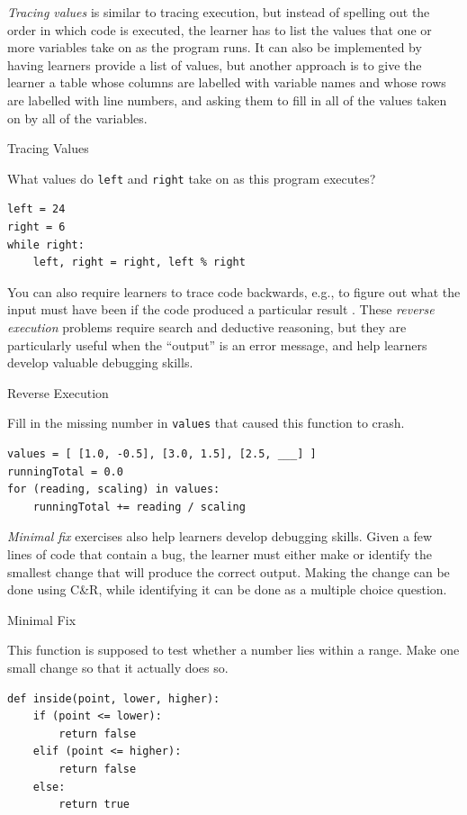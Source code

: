 \emph{Tracing values} is similar to tracing execution, but instead of
spelling out the order in which code is executed, the learner has to
list the values that one or more variables take on as the program runs.
It can also be implemented by having learners provide a list of values,
but another approach is to give the learner a table whose columns are
labelled with variable names and whose rows are labelled with line
numbers, and asking them to fill in all of the values taken on by all of
the variables.

\begin{aside}{Tracing Values}

What values do \texttt{left} and \texttt{right} take on as this program executes?

\begin{verbatim}
left = 24
right = 6
while right:
    left, right = right, left % right
\end{verbatim}

\end{aside}

You can also require learners to trace code backwards, e.g., to figure
out what the input must have been if the code produced a particular
result \cite{Armo2008}. These \emph{reverse execution} problems require
search and deductive reasoning, but they are particularly useful when
the ``output'' is an error message, and help learners develop valuable
debugging skills.

\begin{aside}{Reverse Execution}

Fill in the missing number in \texttt{values} that caused this function to
crash.

\begin{verbatim}
values = [ [1.0, -0.5], [3.0, 1.5], [2.5, ___] ]
runningTotal = 0.0
for (reading, scaling) in values:
    runningTotal += reading / scaling
\end{verbatim}

\end{aside}

\emph{Minimal fix} exercises also help learners develop debugging skills.
Given a few lines of code that contain a bug, the learner must either
make or identify the smallest change that will produce the correct
output. Making the change can be done using C\&R, while identifying it
can be done as a multiple choice question.

\begin{aside}{Minimal Fix}

This function is supposed to test whether a number lies within a
range. Make one small change so that it actually does so.

\begin{verbatim}
def inside(point, lower, higher):
    if (point <= lower):
        return false
    elif (point <= higher):
        return false
    else:
        return true
\end{verbatim}

\end{aside}

